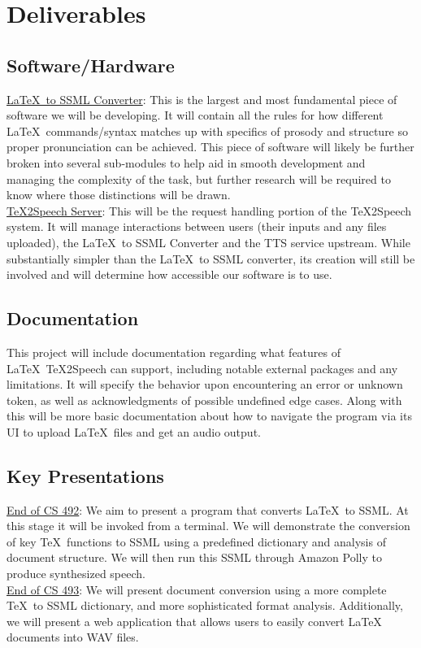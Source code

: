 \section{Deliverables}

\subsection{Software/Hardware}
\underline{\LaTeX\ to SSML Converter}: This is the largest and most fundamental piece of software we will be developing. It will contain all the rules for how different \LaTeX\ commands/syntax matches up with specifics of prosody and structure so proper pronunciation can be achieved. This piece of software will likely be further broken into several sub-modules to help aid in smooth development and managing the complexity of the task, but further research will be required to know where those distinctions will be drawn.\\
\newline
\underline{\TeX 2Speech Server}: This will be the request handling portion of the \TeX 2Speech system. It will manage interactions between users (their inputs and any files uploaded), the \LaTeX\ to SSML Converter and the TTS service upstream. While substantially simpler than the \LaTeX\ to SSML converter, its creation will still be involved and will determine how accessible our software is to use.

\subsection{Documentation}
This project will include documentation regarding what features of \LaTeX\ \TeX 2Speech can support, including notable external packages and any limitations. It will specify the behavior upon encountering an error or unknown token, as well as acknowledgments of possible undefined edge cases. Along with this will be more basic documentation about how to navigate the program via its UI to upload \LaTeX\ files and get an audio output.

\subsection{Key Presentations}
\underline{End of CS 492}: We aim to present a program that converts \LaTeX\ to SSML. At this stage it will be invoked from a terminal. We will demonstrate the conversion of key \TeX\ functions to SSML using a predefined dictionary and analysis of document structure. We will then run this SSML through Amazon Polly to produce synthesized speech. \\
\newline
\underline{End of CS 493}: We will present document conversion using a more complete \TeX\ to SSML dictionary, and more sophisticated format analysis. Additionally, we will present a web application that allows users to easily convert LaTeX documents into WAV files.